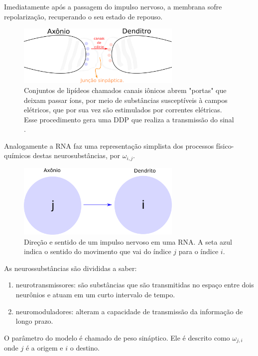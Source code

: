 Imediatamente após a passagem do impulso nervoso, a membrana sofre repolarização, recuperando o seu estado de repouso. 

\begin{figure}[H]
	\centering
	\includegraphics[width=0.7\textwidth]{Imagens/Fig4.png}
	\caption{Conjuntos de lipídeos chamados canais iônicos abrem "portas" que deixam passar íons, por meio de substâncias susceptíveis à campos elétricos, que por sua vez são estimulados por correntes elétricas. Esse procedimento gera uma DDP  que realiza a transmissão do sinal \citep{Kandel2000}.}
\end{figure}

Analogamente a RNA faz uma representação simplista dos processos físico-químicos destas neurosubstâncias, por $\omega_{i,j}$. 

\begin{figure}[H]
	\centering
	\includegraphics[width=0.7\textwidth]{Imagens/Fig5.png}
	\caption{Direção e sentido de um impulso nervoso em uma RNA. A seta azul indica o sentido do movimento que vai do índice $j$ para o índice $i$.}
\end{figure} 

As neurossubstâncias são divididas a saber:

\begin{enumerate}
	\item neurotransmissores: são substâncias que são transmitidas no espaço entre dois neurônios e atuam em um curto intervalo de tempo.
	\item neuromoduladores: alteram a capacidade de transmissão da informação de longo prazo.
\end{enumerate}


O parâmetro do modelo é chamado de peso sináptico. Ele é descrito como $\omega_{j,i}$ onde $j$ é a origem e $i$ o destino.

